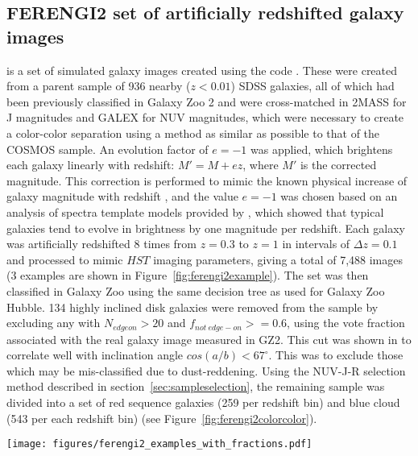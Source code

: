 \subsection{FERENGI2 set of artificially redshifted galaxy images}
\label{ssec:ferengi}
 is a set of simulated galaxy images created using the \ferengi{} code \citep{Barden2008}. These were created from a parent sample of 936 nearby ($z<0.01$) SDSS galaxies, all of which had been previously classified in Galaxy Zoo 2 and were cross-matched in 2MASS \citep{Skrutskie2006} for J magnitudes and GALEX \citep{Martin2005} for NUV magnitudes, which were necessary to create a color-color separation using a method as similar as possible to that of the COSMOS sample.  An evolution factor of $e=-1$ was applied, which brightens each galaxy linearly with redshift: $M' = M + ez$, where $M'$ is the corrected magnitude. This correction is performed to mimic the known physical increase of galaxy magnitude with redshift \citep{Lilly1998,Loveday2011}, and the value $e=-1$ was chosen based on an analysis of spectra template models provided by \citet{Brinchmann2004a}, which showed that typical galaxies tend to evolve in brightness by one magnitude per redshift. Each galaxy was artificially redshifted 8 times from $z=0.3$ to $z=1$ in intervals of $\Delta z = 0.1$ and processed to mimic $HST$ imaging parameters, giving a total of 7,488 images (3 examples are shown in Figure~\ref{fig:ferengi2example}).  The set was then classified in Galaxy Zoo using the same decision tree as used for Galaxy Zoo Hubble. 134 highly inclined disk galaxies were removed from the sample by excluding any with $N_{edgeon}>20$ and $f_{not~edge-on}>=0.6$, using the vote fraction associated with the real galaxy image measured in GZ2. This cut was shown in \citet{Galloway2015} to correlate well with inclination angle $cos(a/b)<67^\circ$. This was to exclude those which may be mis-classified due to dust-reddening.  Using the NUV-J-R selection method described in section~\ref{sec:sampleselection}, the remaining sample was divided into a set of red sequence galaxies (259 per redshift bin) and blue cloud (543 per each redshift bin) (see Figure~\ref{fig:ferengi2colorcolor}).
\begin{figure*}
\centering
\texttt{[image: figures/ferengi2\_examples\_with\_fractions.pdf]}
\caption{Example images of three galaxies artificially redshifted with the \ferengi{} code. The left image in each row is a real SDSS gri-composite image; the four to the right are images generated by \ferengi{} at varying redshifts, processed to mimic $HST/COSMOS$ imaging. The \ffeatures{} vote fraction for each simulated image is given; this value tends to decrease for each galaxy as it is processed to be viewed at higher redshifts. }
\label{fig:ferengi2example}
\end{figure*}

